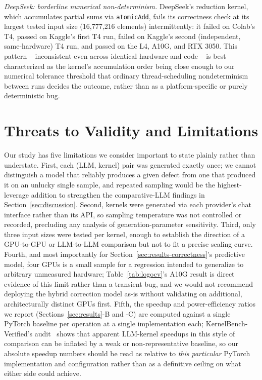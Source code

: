 \documentclass[conference]{IEEEtran}
\begin{document}
\textit{DeepSeek: borderline numerical non-determinism.} DeepSeek's reduction kernel, which
accumulates partial sums via \texttt{atomicAdd}, fails its correctness check at its largest tested
input size (16{,}777{,}216 elements) intermittently: it failed on Colab's T4, passed on Kaggle's
first T4 run, failed on Kaggle's second (independent, same-hardware) T4 run, and passed on the
L4, A10G, and RTX 3050. This pattern -- inconsistent even across identical hardware and code -- is
best characterized as the kernel's accumulation order being close enough to our numerical
tolerance threshold that ordinary thread-scheduling nondeterminism between runs decides the
outcome, rather than as a platform-specific or purely deterministic bug.

\section{Threats to Validity and Limitations}
\label{sec:limitations}

Our study has five limitations we consider important to state plainly rather than understate.
First, each (LLM, kernel) pair was generated exactly once; we cannot distinguish a model that
reliably produces a given defect from one that produced it on an unlucky single sample, and
repeated sampling would be the highest-leverage addition to strengthen the comparative-LLM
findings in Section~\ref{sec:discussion}. Second, kernels were generated via each provider's chat
interface rather than its API, so sampling temperature was not controlled or recorded, precluding
any analysis of generation-parameter sensitivity. Third, only three input sizes were tested per
kernel, enough to establish the direction of a GPU-to-GPU or LLM-to-LLM comparison but not to fit
a precise scaling curve. Fourth, and most importantly for Section~\ref{sec:results-correctness}'s
predictive model, four GPUs is a small sample for a regression intended to generalize to arbitrary
unmeasured hardware; Table~\ref{tab:logocv}'s A10G result is direct evidence of this limit rather
than a transient bug, and we would not recommend deploying the hybrid correction model as-is
without validating on additional, architecturally distinct GPUs first. Fifth, the speedup and
power-efficiency ratios we report (Sections~\ref{sec:results}-B and -C) are computed against a
single PyTorch baseline per operation at a single implementation each; KernelBench-Verified's
audit~\cite{kernelbench-verified} shows that apparent LLM-kernel speedups in this style of
comparison can be inflated by a weak or non-representative baseline, so our absolute speedup
numbers should be read as relative to \emph{this particular} PyTorch implementation and configuration
rather than as a definitive ceiling on what either side could achieve.
\end{document}
